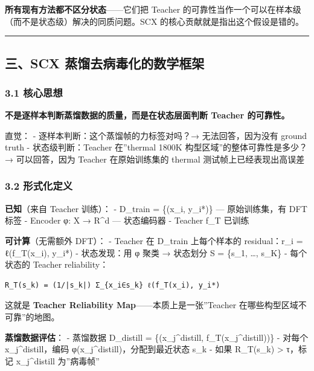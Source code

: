 \documentclass[
  12pt,
]{ctexart}
\begin{document}
\textbf{所有现有方法都不区分状态}------它们把 Teacher
的可靠性当作一个可以在样本级（而不是状态级）解决的同质问题。SCX
的核心贡献就是指出这个假设是错的。

\begin{center}\rule{0.5\linewidth}{0.5pt}\end{center}

\subsection{三、SCX
蒸馏去病毒化的数学框架}\label{ux4e09scx-ux84b8ux998fux53bbux75c5ux6bd2ux5316ux7684ux6570ux5b66ux6846ux67b6}

\subsubsection{3.1 核心思想}\label{ux6838ux5fc3ux601dux60f3}

\textbf{不是逐样本判断蒸馏数据的质量，而是在状态层面判断 Teacher
的可靠性。}

直觉： - 逐样本判断：这个蒸馏帧的力标签对吗？→ 无法回答，因为没有 ground
truth - 状态级判断：Teacher 在''thermal 1800K
构型区域''的整体可靠性是多少？→ 可以回答，因为 Teacher 在原始训练集的
thermal 测试帧上已经表现出高误差

\subsubsection{3.2 形式化定义}\label{ux5f62ux5f0fux5316ux5b9aux4e49}

\textbf{已知}（来自 Teacher 训练）： - D\_train = \{(x\_i, y\_i*)\} ---
原始训练集，有 DFT 标签 - Encoder φ: X → R\^{}d --- 状态编码器 - Teacher
f\_T 已训练

\textbf{可计算}（无需额外 DFT）： - Teacher 在 D\_train 上每个样本的
residual：r\_i = ℓ(f\_T(x\_i), y\_i*) - 状态发现：用 φ 聚类 → 状态划分 S
= \{s\_1, \ldots, s\_K\} - 每个状态的 Teacher reliability：

\begin{verbatim}
R_T(s_k) = (1/|s_k|) Σ_{x_i∈s_k} ℓ(f_T(x_i), y_i*)
\end{verbatim}

这就是 \textbf{Teacher Reliability Map}------本质上是一张''Teacher
在哪些构型区域不可靠''的地图。

\textbf{蒸馏数据评估}： - 蒸馏数据 D\_distill = \{(x\_j\^{}distill,
f\_T(x\_j\^{}distill))\} - 对每个 x\_j\^{}distill，编码
φ(x\_j\^{}distill)，分配到最近状态 s\_k - 如果 R\_T(s\_k) \textgreater{}
τ，标记 x\_j\^{}distill 为''病毒帧''
\end{document}
